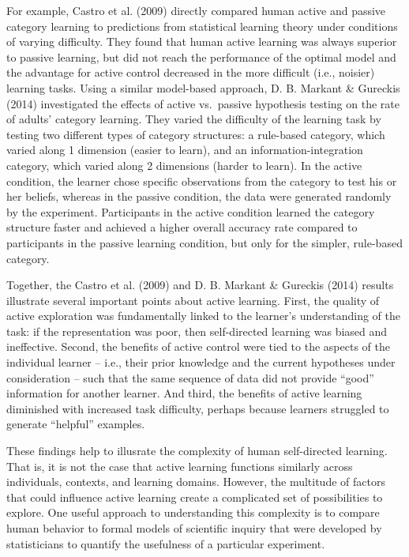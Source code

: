 \documentclass[a4paper,man,apacite,floatsintext]{apa6}
\begin{document}
For example, Castro et al. (2009) directly compared human active and
passive category learning to predictions from statistical learning
theory under conditions of varying difficulty. They found that human
active learning was always superior to passive learning, but did not
reach the performance of the optimal model and the advantage for active
control decreased in the more difficult (i.e., noisier) learning tasks.
Using a similar model-based approach, D. B. Markant \& Gureckis (2014)
investigated the effects of active vs.~passive hypothesis testing on the
rate of adults' category learning. They varied the difficulty of the
learning task by testing two different types of category structures: a
rule-based category, which varied along 1 dimension (easier to learn),
and an information-integration category, which varied along 2 dimensions
(harder to learn). In the active condition, the learner chose specific
observations from the category to test his or her beliefs, whereas in
the passive condition, the data were generated randomly by the
experiment. Participants in the active condition learned the category
structure faster and achieved a higher overall accuracy rate compared to
participants in the passive learning condition, but only for the
simpler, rule-based category.

Together, the Castro et al. (2009) and D. B. Markant \& Gureckis (2014)
results illustrate several important points about active learning.
First, the quality of active exploration was fundamentally linked to the
learner's understanding of the task: if the representation was poor,
then self-directed learning was biased and ineffective. Second, the
benefits of active control were tied to the aspects of the individual
learner -- i.e., their prior knowledge and the current hypotheses under
consideration -- such that the same sequence of data did not provide
``good'' information for another learner. And third, the benefits of
active learning diminished with increased task difficulty, perhaps
because learners struggled to generate ``helpful'' examples.

These findings help to illusrate the complexity of human self-directed
learning. That is, it is not the case that active learning functions
similarly across individuals, contexts, and learning domains. However,
the multitude of factors that could influence active learning create a
complicated set of possibilities to explore. One useful approach to
understanding this complexity is to compare human behavior to formal
models of scientific inquiry that were developed by statisticians to
quantify the usefulness of a particular experiment.
\end{document}
